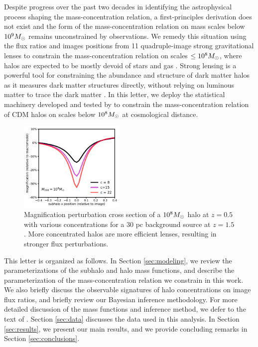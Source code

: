 Despite progress over the past two decades in identifying the astrophysical process shaping the mass-concentration relation, a first-principles derivation does not exist and the form of the mass-concentration relation on mass scales below $10^{9} {M_{\odot}}$ remains unconstrained by observations. We remedy this situation using the flux ratios and images positions from 11 quadruple-image strong gravitational lenses to constrain the mass-concentration relation on scales $\leq 10^{8} {M_{\odot}}$, where halos are expected to be mostly devoid of stars and gas \cite{Sawala++15}. Strong lensing is a powerful tool for constraining the abundance and structure of dark matter halos as it measures dark matter structures directly, without relying on luminous matter to trace the dark matter \cite{D+K02,Veg++14,Nierenberg++14,Birrer++17a,Hsueh++19,Gilman++19b}. In this letter, we deploy the statistical machinery developed and tested by \cite{Gilman++19} to constrain the mass-concentration relation of CDM halos on scales below $10^8 {M_{\odot}}$ at cosmological distance. 
\begin{figure}
	\includegraphics[clip,trim=0cm 0cm 0cm
	0cm,width=0.45\textwidth,keepaspectratio]{./figures_mcrelation/concentration_cross_section.pdf}
	\captionsetup{width=.45\textwidth}
	\caption{\label{fig:cross} Magnification perturbation cross section of a $10^{8} {M_{\odot}}$ halo at $z=0.5$ with various concentrations for a 30 pc background source at $z=1.5$. More concentrated halos are more efficient lenses, resulting in stronger flux perturbations.}
\end{figure}	

This letter is organized as follows. In Section \ref{sec:modeling}, we review the parameterizations of the subhalo and halo mass functions, and describe the parameterization of the mass-concentration relation we constrain in this work. We also briefly discuss the observable signatures of halo concentrations on image flux ratios, and briefly review our Bayesian inference methodology. For more detailed discussion of the mass functions and inference method, we defer to the text of \cite{Gilman++19b}. Section \ref{sec:data} discusses the data used in this analysis. In Section \ref{sec:results}, we present our main results, and we provide concluding remarks in Section \ref{sec:conclusions}. 

